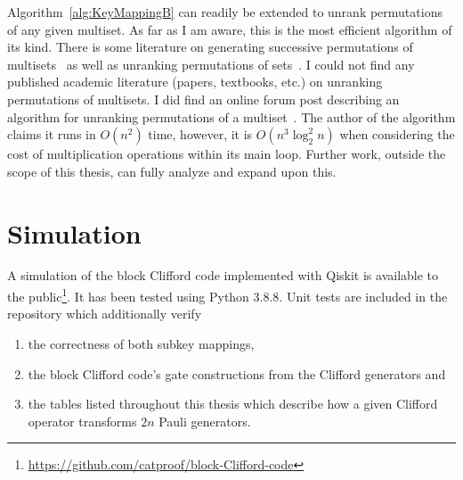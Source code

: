 Algorithm~\ref{alg:KeyMappingB} can readily be extended to unrank permutations of any given multiset. As far as I am aware, this is the most efficient algorithm of its kind. There is some literature on generating successive permutations of multisets~\cite{takaoka2015multi} as well as unranking permutations of sets~\cite{myrvold2001ranking}. I could not find any published academic literature (papers, textbooks, etc.) on unranking permutations of multisets. I did find an online forum post describing an algorithm for unranking permutations of a multiset~\cite{unrankingMultisetStackOverflow}. The author of the algorithm claims it runs in $O\left(n^2\right)$ time, however, it is $O\left(n^3 \log_2^2 n\right)$ when considering the cost of multiplication operations within its main loop. Further work, outside the scope of this thesis, can fully analyze and expand upon this.

\section{Simulation}
A simulation of the block Clifford code implemented with Qiskit is available to the public\footnote{\url{https://github.com/catproof/block-Clifford-code}}. It has been tested using Python 3.8.8. Unit tests are included in the repository which additionally verify
\begin{enumerate}
    \item the correctness of both subkey mappings,
    \item the block Clifford code's gate constructions from the Clifford generators and
    \item the tables listed throughout this thesis which describe how a given Clifford operator transforms $2n$ Pauli generators.
\end{enumerate}
